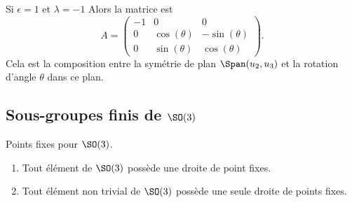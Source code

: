 \begin{subproof}
    \item[Si \( \epsilon=1\) et \( \lambda=-1\)] Alors la matrice est
        \begin{equation}
            A=\begin{pmatrix}
                -1    &   0    &   0    \\
                0    &   \cos(\theta)    &   -\sin(\theta)    \\
                0    &   \sin(\theta)    &   \cos(\theta)
            \end{pmatrix}.
        \end{equation}
        Cela est la composition entre la symétrie de plan \( \Span(u_2,u_3)\) et la rotation d'angle \( \theta\) dans ce plan.
\end{subproof}

\subsection{Sous-groupes finis de \( \SO(3)\)}

\begin{lemma}       \label{LEMooWIMMooXOCfSt}
    Points fixes pour \( \SO(3)\).
    \begin{enumerate}
        \item
            Tout élément de \( \SO(3)\) possède une droite de point fixes.
        \item
            Tout élément non trivial de \( \SO(3)\) possède une seule droite de points fixes.
    \end{enumerate}
\end{lemma}

